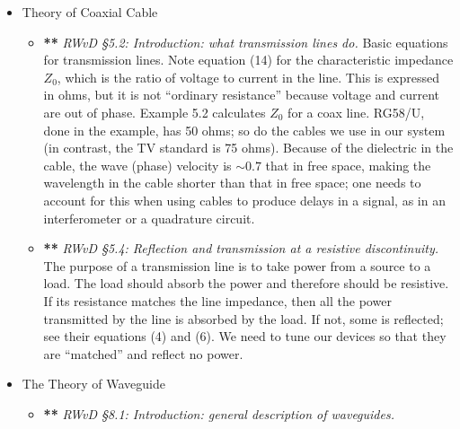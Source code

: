 \documentclass[11pt,preprint]{aastex}
\begin{document}
\begin{itemize}
\item Theory of Coaxial Cable

\begin{itemize}
	
\item {\bf ***} {\it RWvD \S 5.2:  Introduction: what transmission lines do.}
Basic equations for transmission lines.  Note
equation (14) for the characteristic impedance $Z_0$, which is the ratio
of voltage to current in the line.  This is expressed in ohms, but it is
not ``ordinary resistance'' because voltage and current are out of
phase.  Example 5.2 calculates $Z_0$ for a coax line.  RG58/U, done in
the example, has 50 ohms; so do the cables we use in our system (in
contrast, the TV standard is 75 ohms).  Because of the dielectric in the
cable, the wave (phase) velocity is $\sim 0.7$ that in free space,
making the wavelength in the cable shorter than that in free space; one
needs to account for this when using cables to produce delays in a
signal, as in an interferometer or a quadrature circuit. 

\item {\bf ***} {\it RWvD \S 5.4: Reflection and transmission at a resistive
discontinuity.} The purpose of a transmission line is to take power from
a source to a load. The load should absorb the power and therefore
should be resistive. If its resistance matches the line impedance, then
all the power transmitted by the line is absorbed by the load. If not,
some is reflected; see their equations (4) and (6). We need to tune our
devices so that they are ``matched'' and reflect no power. 
\end{itemize}

\item The Theory of Waveguide
          
\begin{itemize}

\item {\bf ***} {\it RWvD \S 8.1:  Introduction: general description of
waveguides.} 


\end{itemize}
\end{itemize}
\end{document}
